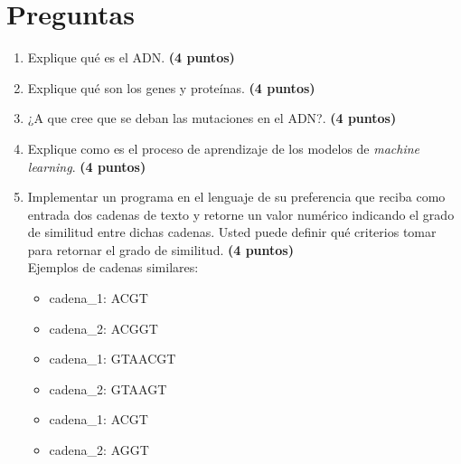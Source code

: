 \documentclass{article}
\begin{document}
	
	
	
	\section*{Preguntas}
	
	\begin{enumerate}
		\item Explique qué es el ADN. \textbf{(4 puntos)}
		\item Explique qué son los genes y proteínas. \textbf{(4 puntos)}
		\item ¿A que cree que se deban las mutaciones en el ADN?. \textbf{(4 puntos)}
		\item Explique como es el proceso de aprendizaje de los modelos de \textit{machine learning}. \textbf{(4 puntos)}
		\item Implementar un programa en el lenguaje de su preferencia que reciba como entrada dos cadenas de texto y retorne un valor numérico indicando el grado de similitud entre dichas cadenas. Usted puede definir qué criterios tomar para retornar el grado de similitud. \textbf{(4 puntos)}\\
		
		Ejemplos de cadenas similares: 
		\begin{itemize}
			\item 	cadena\_1: ACGT
			\item 	cadena\_2: ACGGT \\
			\item 	cadena\_1: GTAACGT
			\item 	cadena\_2: GTAAGT \\
			\item 	cadena\_1: ACGT
			\item 	cadena\_2: AGGT
		\end{itemize}		
		
	\end{enumerate}
	

	
	
\end{document}
